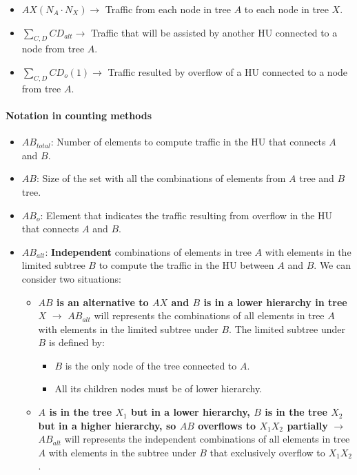 \documentclass[../main.tex]{subfiles}
\begin{document}
\begin{itemize}
	\item $AX (N_A \cdot N_X) \rightarrow$ Traffic from each node in tree $A$ to each node in tree $X$.
	\item $\sum_{C, D} CD_{alt} \rightarrow$ Traffic that will be assisted by another HU connected to a node from tree $A$.
	\item $\sum_{C, D} CD_o (1) \rightarrow$ Traffic resulted by overflow of a HU connected to a node from tree $A$.
\end{itemize}

\paragraph{Notation in counting methods}

\begin{itemize}
	\item $AB_{total}$: Number of elements to compute traffic in the HU that connects $A$ and $B$.
	\item $AB$: Size of the set with all the combinations of elements from $A$ tree and $B$ tree.
	\item $AB_o$: Element that indicates the traffic resulting from overflow in the HU that connects $A$ and $B$.
	\item {
		$AB_{alt}$: \textbf{Independent} combinations of elements in tree $A$ with elements in the limited subtree $B$ to compute the traffic in the HU between $A$ and $B$. We can consider two situations:
		\begin{itemize}
			\item {
				\textbf{$AB$ is an alternative to $AX$ and $B$ is in a lower hierarchy in tree $X$} $\rightarrow$ $AB_{alt}$ will represents the combinations of all elements in tree $A$ with elements in the limited subtree under $B$. The limited subtree under $B$ is defined by:
				\begin{itemize}
					\item $B$ is the only node of the tree connected to $A$.
					\item All its children nodes must be of lower hierarchy.
				\end{itemize}
			}
			\item {
				\textbf{$A$ is in the tree $X_1$ but in a lower hierarchy, $B$ is in the tree $X_2$ but in a higher hierarchy, so $AB$ overflows to $X_1 X_2$ partially} $\rightarrow$ $AB_{alt}$ will represents the independent combinations of all elements in tree $A$ with elements in the subtree under $B$ that exclusively overflow to $X_1 X_2$.
			}
		\end{itemize}
	}
\end{itemize}
\end{document}
